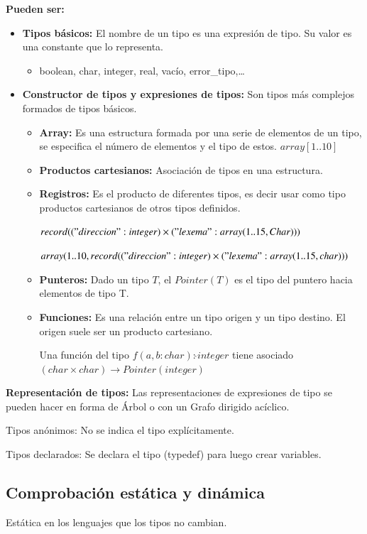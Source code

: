 \documentclass[12pt, twoside, openright]{report} %
\begin{document}
\textbf{Pueden ser:}
\begin{itemize}
  \item \textbf{Tipos básicos:} El nombre de un tipo es una expresión de tipo. Su valor es una constante que lo representa.
  \begin{itemize}
    \item boolean, char, integer, real, vacío, error\_tipo,\dots
  \end{itemize}
  \item \textbf{Constructor de tipos y expresiones de tipos:} Son tipos más complejos formados de tipos básicos.
  \begin{itemize}
    \item \textbf{Array:} Es una estructura formada por una serie de elementos de un tipo, se especifica el número de elementos y el tipo de estos. $array[1\text{..}10]$
    \item \textbf{Productos cartesianos:} Asociación de tipos en una estructura.
    \item \textbf{Registros:} Es el producto de diferentes tipos, es decir usar como tipo productos cartesianos de otros tipos definidos.
    
    $record (("direccion" : integer) \times ("lexema" : array(1..15, Char)))$
    
    $array(1\text{..}10, record (("direccion" : integer) \times ("lexema" : array(1\text{..}15,char)))$

    \item \textbf{Punteros:} Dado un tipo $T$, el $Pointer(T)$ es el tipo del puntero hacia elementos de tipo T.
    \item \textbf{Funciones:} Es una relación entre un tipo origen y un tipo destino. El origen suele ser un producto cartesiano.
    
    Una función del tipo $f(a,b:char) : \hat{} integer$ tiene asociado $(char \times char) \rightarrow Pointer(integer)$
  \end{itemize}
\end{itemize}
\textbf{Representación de tipos:}
Las representaciones de expresiones de tipo se pueden hacer en forma de Árbol o con un Grafo dirigido acíclico.

Tipos anónimos: No se indica el tipo explícitamente.

Tipos declarados: Se declara el tipo (typedef) para luego crear variables.


\subsection{Comprobación estática y dinámica}
Estática en los lenguajes que los tipos no cambian.
\end{document}
